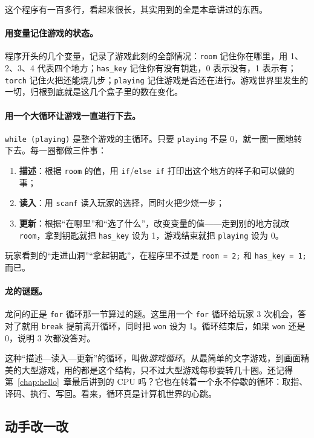这个程序有一百多行，看起来很长，其实用到的全是本章讲过的东西。

\paragraph{用变量记住游戏的状态。}程序开头的几个变量，记录了游戏此刻的全部情况：\texttt{room} 记住你在哪里，用 1、2、3、4 代表四个地方；\texttt{has\_key} 记住你有没有钥匙，0 表示没有，1 表示有；\texttt{torch} 记住火把还能烧几步；\texttt{playing} 记住游戏是否还在进行。游戏世界里发生的一切，归根到底就是这几个盒子里的数在变化。

\paragraph{用一个大循环让游戏一直进行下去。}\texttt{while (playing)} 是整个游戏的主循环。只要 \texttt{playing} 不是 0，就一圈一圈地转下去。每一圈都做三件事：
\begin{enumerate}
  \item \textbf{描述}：根据 \texttt{room} 的值，用 \texttt{if}/\texttt{else if} 打印出这个地方的样子和可以做的事；
  \item \textbf{读入}：用 \texttt{scanf} 读入玩家的选择，同时火把少烧一步；
  \item \textbf{更新}：根据“在哪里”和“选了什么”，改变变量的值——走到别的地方就改 \texttt{room}，拿到钥匙就把 \texttt{has\_key} 设为 1，游戏结束就把 \texttt{playing} 设为 0。
\end{enumerate}
玩家看到的“走进山洞”“拿起钥匙”，在程序里不过是 \texttt{room = 2;} 和 \texttt{has\_key = 1;} 而已。

\paragraph{龙的谜题。}龙问的正是 \texttt{for} 循环那一节算过的题。这里用一个 \texttt{for} 循环给玩家 3 次机会，答对了就用 \texttt{break} 提前离开循环，同时把 \texttt{won} 设为 1。循环结束后，如果 \texttt{won} 还是 0，说明 3 次都没答对。

这种“描述—读入—更新”的循环，叫做\emph{游戏循环}。从最简单的文字游戏，到画面精美的大型游戏，用的都是这个结构，只不过大型游戏每秒要转几十圈。还记得第~\ref{chap:hello}~章最后讲到的 CPU 吗？它也在转着一个永不停歇的循环：取指、译码、执行、写回。看来，循环真是计算机世界的心跳。

\subsection{动手改一改}

